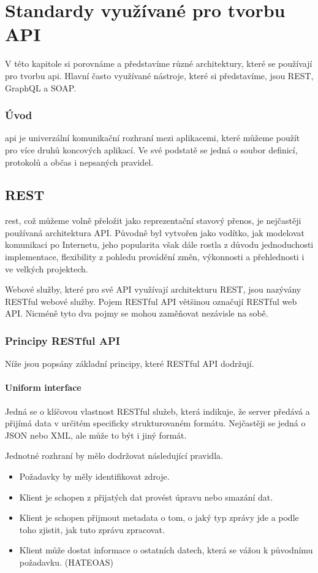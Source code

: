 \chapter{Standardy využívané pro tvorbu API}
V této kapitole si porovnáme a představíme různé architektury, které se používají pro tvorbu \gls{api}.
Hlavní často využívané nástroje, které si představíme, jsou REST, GraphQL a SOAP.

\subsection*{Úvod}
\gls{api} je univerzální komunikační rozhraní mezi aplikacemi, které můžeme použít pro více druhů koncových aplikací. Ve své podstatě se jedná o soubor definicí, protokolů a občas i nepsaných pravidel.


\section{REST}
\gls{rest}, což můžeme volně přeložit jako reprezentační stavový přenos, je nejčastěji používaná architektura API. Původně byl vytvořen jako vodítko, jak modelovat komunikaci po Internetu, jeho popularita však dále rostla z důvodu jednoduchosti implementace, flexibility z pohledu provádění změn, výkonnosti a přehlednosti i ve velkých projektech.

Webové služby, které pro své API využívají architekturu REST, jsou nazývány RESTful webové služby. Pojem RESTful API většinou označují RESTful web API. Nicméně tyto dva pojmy se mohou zaměňovat nezávisle na sobě.


\subsection{Principy RESTful API}

Níže jsou popsány základní principy, které RESTful API dodržují.

\subsubsection*{Uniform interface}
Jedná se o klíčovou vlastnost RESTful služeb, která indikuje, že server předává a přijímá data v určitém specificky strukturovaném formátu. Nejčastěji se jedná o JSON nebo XML, ale může to být i jiný formát.

Jednotné rozhraní by mělo dodržovat následující pravidla.\
\begin{itemize}
    \item Požadavky by měly identifikovat zdroje.
    \item Klient je schopen z přijatých dat provést úpravu nebo smazání dat.
    \item Klient je schopen přijmout metadata o tom, o jaký typ zprávy jde a podle toho zjistit, jak tuto zprávu zpracovat.
    \item Klient může dostat informace o ostatních datech, která se vážou k původnímu požadavku. (HATEOAS)%
\end{itemize}

